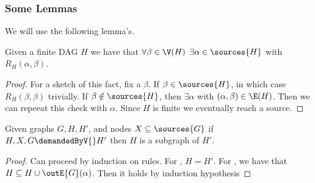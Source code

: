 \subsubsection{Some Lemmas}
We will use the following lemma's.
\begin{lemma}
   Given a finite DAG $H$ we have that $\forall \beta \in \V(H)$ $\exists \alpha \in \sources{H}$ with $R_{H}(\alpha, \beta)$.
\end{lemma}
\begin{proof}
   For a sketch of this fact, fix a $\beta$. If $\beta \in \sources{H}$,
   in which case $R_{H}(\beta, \beta)$ trivially. If $\beta \notin \sources{H}$, then $\exists \alpha$
   with $(\alpha,\beta) \in \E(H)$. Then we can repeeat this check with $\alpha$. Since $H$ is finite
   we eventually reach a source.
\end{proof}


\begin{lemma}
   \label{lem:partial-slice-sub-slice}
   Given graphs $G,H,H'$, and nodes $X \subseteq \sources{G}$ if
   $H, X, G \demandedByV{} H'$ then $H$ is a subgraph of $H'$.
\end{lemma}
\begin{proof}
   Can proceed by induction on rules. For , $H = H'$.
   For , we have that $H \subseteq H \cup \outE{G}(\alpha)$.
   Then it holds by induction hypothesis
\end{proof}

